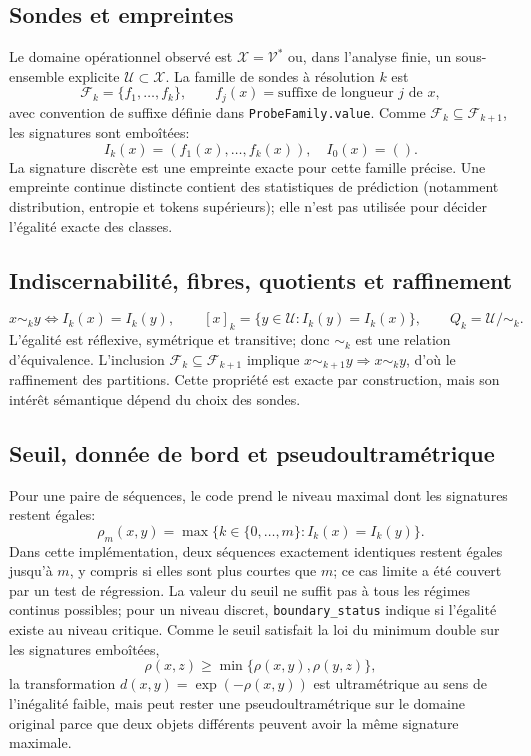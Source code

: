 \documentclass[11pt,a4paper]{article}
\begin{document}
\subsection{Sondes et empreintes}
Le domaine opérationnel observé est $\mathcal X=\mathcal V^*$ ou, dans l'analyse finie, un sous-ensemble explicite $\mathcal U\subset\mathcal X$. La famille de sondes à résolution $k$ est
\[
\mathcal F_k=\{f_1,\ldots,f_k\},\qquad f_j(x)=\text{suffixe de longueur }j\text{ de }x,
\]
avec convention de suffixe définie dans \texttt{ProbeFamily.value}. Comme $\mathcal F_k\subseteq\mathcal F_{k+1}$, les signatures sont emboîtées:
\[
I_k(x)=(f_1(x),\ldots,f_k(x)),\quad I_0(x)=().
\]
La signature discrète est une empreinte exacte pour cette famille précise. Une empreinte continue distincte contient des statistiques de prédiction (notamment distribution, entropie et tokens supérieurs); elle n'est pas utilisée pour décider l'égalité exacte des classes.
\subsection{Indiscernabilité, fibres, quotients et raffinement}
\[
x\sim_k y\iff I_k(x)=I_k(y),\qquad [x]_k=\{y\in\mathcal U:I_k(y)=I_k(x)\},\qquad Q_k=\mathcal U/\!\sim_k.
\]
L'égalité est réflexive, symétrique et transitive; donc $\sim_k$ est une relation d'équivalence. L'inclusion $\mathcal F_k\subseteq\mathcal F_{k+1}$ implique $x\sim_{k+1}y\Rightarrow x\sim_ky$, d'où le raffinement des partitions. Cette propriété est exacte par construction, mais son intérêt sémantique dépend du choix des sondes.
\subsection{Seuil, donnée de bord et pseudoultramétrique}
Pour une paire de séquences, le code prend le niveau maximal dont les signatures restent égales:
\[
\rho_m(x,y)=\max\{k\in\{0,\ldots,m\}: I_k(x)=I_k(y)\}.
\]
Dans cette implémentation, deux séquences exactement identiques restent égales jusqu'à $m$, y compris si elles sont plus courtes que $m$; ce cas limite a été couvert par un test de régression. La valeur du seuil ne suffit pas à tous les régimes continus possibles; pour un niveau discret, \texttt{boundary\_status} indique si l'égalité existe au niveau critique. Comme le seuil satisfait la loi du minimum double sur les signatures emboîtées,
\[
\rho(x,z)\geq\min\{\rho(x,y),\rho(y,z)\},
\]
la transformation $d(x,y)=\exp(-\rho(x,y))$ est ultramétrique au sens de l'inégalité faible, mais peut rester une pseudoultramétrique sur le domaine original parce que deux objets différents peuvent avoir la même signature maximale.
\end{document}
